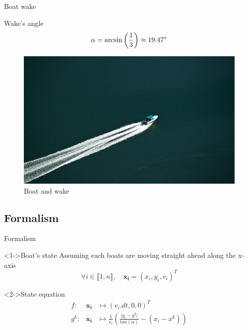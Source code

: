 \documentclass{beamer}
\begin{document}
            \begin{frame}{Boat wake}
                \centering
                \begin{minipage}{0.6\textwidth}
                    \begin{block}{Wake's angle}
                        \begin{equation}
                            \alpha = \arcsin\left(\frac{1}{3}\right) \approx 19.47 \degree
                        \end{equation}
                    \end{block}
                    \vspace{0.2cm}
                    \begin{figure}
                        \centering
                        \includegraphics[width=\textwidth,trim={0 0 17cm 14cm},clip]{imgs/motorboat}
                        \caption{Boat and wake}
                    \end{figure}
                \end{minipage}
            \end{frame}
        
        \subsection{Formalism}

            \begin{frame}{Formalism}
                \begin{block}<1->{Boat's state}
                    Assuming each boats are moving straight ahead along the x-axis
                    $$\forall i \in \llbracket 1, n\rrbracket, \quad \mathbf{x_i} = (x_i, y_i, v_i)^T$$ 
                \end{block}

                \begin{block}<2->{State equation}
                    \begin{eqnarray}
                        f:& \mathbf{x_i} &\mapsto (v_i.dt, 0, 0)^T \\
                        g^k:& \mathbf{x_i}  &\mapsto \frac{1}{v_i} \left(\frac{\lvert y_i - y^k \rvert}{tan(\alpha)} - (x_i - x^k)\right)
                    \end{eqnarray}
                \end{block}
            \end{frame}
        
\end{document}
